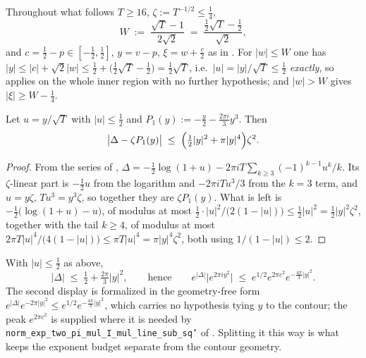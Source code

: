 Throughout what follows $T\ge16$, $\zeta:=T^{-1/2}\le\tfrac14$,
\[
  W\;:=\;\frac{\sqrt T-1}{2\sqrt2}\;=\;\frac{\tfrac12\sqrt T-\tfrac12}{\sqrt2},
\]
and $c=\tfrac12-p\in[-\tfrac12,\tfrac12]$, $y=v-p$, $\xi=w+\tfrac c2$ as in
.  For $\lvert w\rvert\le W$ one has $\lvert y\rvert\le\lvert
c\rvert+\sqrt2\lvert w\rvert\le\tfrac12+\bigl(\tfrac12\sqrt T-\tfrac12\bigr)=\tfrac12\sqrt T$,
i.e.\ $\lvert u\rvert=\lvert y\rvert/\sqrt T\le\tfrac12$ \emph{exactly}, so
 applies on the whole inner region with no further hypothesis;
and $\lvert w\rvert>W$ gives $\lvert\xi\rvert\ge W-\tfrac14$.

\begin{lemma}
\label{lem:rsf_delta_split}
\leanok
{}
Let $u=y/\sqrt T$ with $\lvert u\rvert\le\tfrac12$ and
$P_{1}(y):=-\tfrac y2-\tfrac{2\pi i}{3}y^{3}$.  Then
\[
  \bigl\lvert\Delta-\zeta P_{1}(y)\bigr\rvert
  \;\le\;\Bigl(\tfrac12\lvert y\rvert^{2}+\pi\lvert y\rvert^{4}\Bigr)\zeta^{2}.
\]
\end{lemma}

\begin{proof}
\leanok
{}
From the series of , $\Delta=-\tfrac12\log(1+u)-2\pi
iT\sum_{k\ge3}(-1)^{k-1}u^{k}/k$.  Its $\zeta$-linear part is $-\tfrac12u$ from the logarithm
and $-2\pi iTu^{3}/3$ from the $k=3$ term, and $u=y\zeta$, $Tu^{3}=y^{3}\zeta$, so together they
are $\zeta P_{1}(y)$.  What is left is $-\tfrac12\bigl(\log(1+u)-u\bigr)$, of modulus at most
$\tfrac12\cdot\lvert u\rvert^{2}/\bigl(2(1-\lvert u\rvert)\bigr)\le\tfrac12\lvert u\rvert^{2}
=\tfrac12\lvert y\rvert^{2}\zeta^{2}$, together with the tail $k\ge4$, of modulus at most
$2\pi T\lvert u\rvert^{4}/\bigl(4(1-\lvert u\rvert)\bigr)\le\pi T\lvert u\rvert^{4}
=\pi\lvert y\rvert^{4}\zeta^{2}$, both using $1/(1-\lvert u\rvert)\le2$.
\end{proof}

\begin{lemma}
\label{lem:rsf_delta_exp}
\leanok
{}
With $\lvert u\rvert\le\tfrac12$ as above,
\[
  \lvert\Delta\rvert\;\le\;\tfrac12+\tfrac{2\pi}3\lvert y\rvert^{2},
  \qquad\text{hence}\qquad
  e^{\lvert\Delta\rvert}\bigl\lvert e^{2\pi iy^{2}}\bigr\rvert
    \;\le\;e^{1/2}e^{2\pi c^{2}}e^{-\frac{4\pi}3\lvert y\rvert^{2}} .
\]
The second display is formalized in the geometry-free form
$e^{\lvert\Delta\rvert}e^{-2\pi\lvert y\rvert^{2}}\le e^{1/2}e^{-\frac{4\pi}3\lvert
y\rvert^{2}}$, which carries no hypothesis tying $y$ to the contour; the peak $e^{2\pi c^{2}}$
is supplied where it is needed by \texttt{norm\_exp\_two\_pi\_mul\_I\_mul\_line\_sub\_sq'} of
.  Splitting it this way is what keeps the exponent budget separate
from the contour geometry.
\end{lemma}

